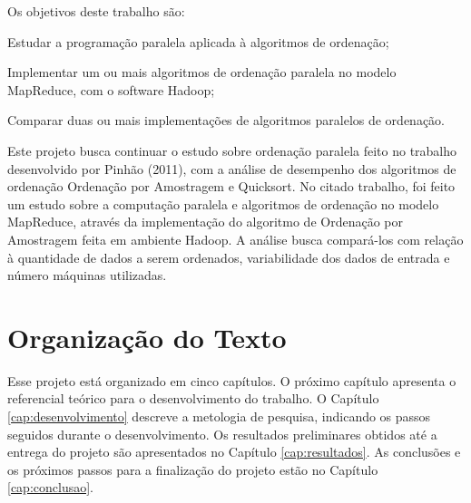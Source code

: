 Os objetivos deste trabalho são:

\begin{packed_enum}
\item Estudar a programação paralela aplicada à algoritmos de ordenação;
\item Implementar um ou mais algoritmos de ordenação paralela no modelo MapReduce, com o software Hadoop;
\item Comparar duas ou mais implementações de algoritmos paralelos de ordenação.
\end{packed_enum}



Este projeto busca continuar o estudo sobre ordenação paralela feito no trabalho desenvolvido por Pinhão (2011), com a análise de desempenho dos algoritmos de ordenação Ordenação por Amostragem e Quicksort. No citado trabalho, foi feito um estudo sobre a computação paralela e algoritmos de ordenação no modelo MapReduce, através da implementação do algoritmo de Ordenação por Amostragem feita em ambiente Hadoop. 
A análise busca compará-los com relação à quantidade de dados a serem ordenados, variabilidade dos dados de entrada e número máquinas utilizadas. 

\section{Organização do Texto}

Esse projeto está organizado em cinco capítulos. O próximo capítulo apresenta o referencial teórico para o desenvolvimento do trabalho. %
O Capítulo \ref{cap:desenvolvimento} descreve a metologia de pesquisa, indicando os passos seguidos durante o desenvolvimento. Os resultados preliminares obtidos até a entrega do projeto são apresentados no Capítulo \ref{cap:resultados}. As conclusões e os próximos passos para a finalização do projeto estão no Capítulo \ref{cap:conclusao}.




